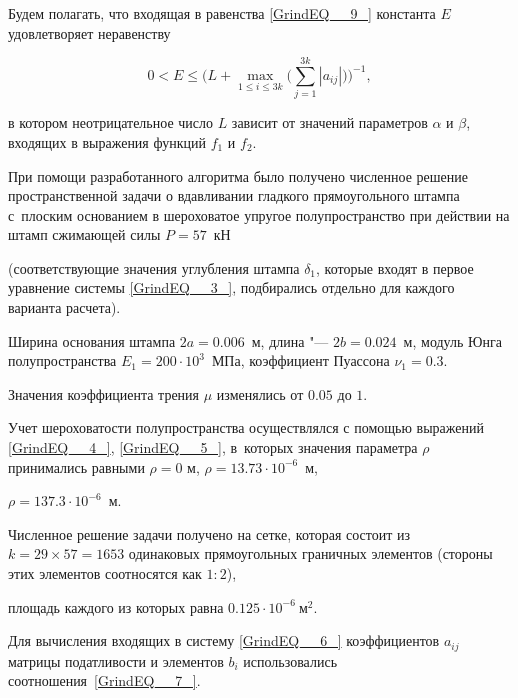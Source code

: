 Будем полагать, что входящая в равенства \eqref{GrindEQ__9_} константа $E$ удовлетворяет неравенству

\begin{equation} 

\label{GrindEQ__10_} 

0<E\le \biggl(L+\max\limits_{1\le i\le 3k}\biggl(\sum _{j=1}^{3k}\left|a_{ij} \right| \biggr)\biggr)^{-1},    

\end{equation}

в котором неотрицательное число $L$ зависит от значений параметров $\alpha $ и $\beta $, входящих в выражения функций $f_{1} $ и $f_{2} $.



\smallskip




При помощи разработанного алгоритма было получено численное решение пространственной задачи о вдавливании гладкого прямоугольного штампа с~плоским основанием в шероховатое упругое полупространство при действии на штамп сжимающей силы $P=57$~кН 

(соответствующие значения углубления штампа $\delta _{1}$, которые входят в первое уравнение системы \eqref{GrindEQ__3_}, подбирались отдельно для каждого варианта расчета). 

Ширина основания штампа $2a=0.006$~м,  длина "--- $2b=0.024$~м, модуль Юнга полупространства $E_{1} =200\cdot 10^{3}$~МПа, коэффициент Пуассона $\nu _{1} =0.3$. 

Значения коэффициента трения $\mu $ изменялись от $0.05$ до $1$. 

Учет шероховатости полупространства осуществлялся с помощью выражений \eqref{GrindEQ__4_}, \eqref{GrindEQ__5_}, в~которых значения параметра $\rho$ принимались равными $\rho =0$ м, $\rho =13.73\cdot 10^{-6}$~м, 

$\rho =137.3\cdot 10^{-6}$~м.

Численное решение задачи получено на сетке, которая состоит из $k=29\times 57=1653$ одинаковых прямоугольных граничных элементов (стороны этих элементов соотносятся как $1:2$), 

площадь каждого из которых равна $0.125\cdot 10^{-6}~\textrm{м}^{2}$. 

Для вычисления входящих в систему \eqref{GrindEQ__6_} коэффициентов $a_{i j} $ матрицы податливости и элементов $b_{i} $ использовались соотношения~\eqref{GrindEQ__7_}. 

